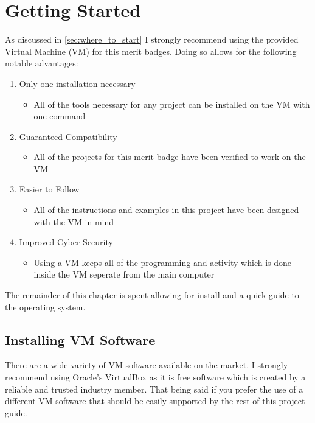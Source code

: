 \graphicspath{ {images/VM_Install} {images/Ubuntu_Intro} }

\chapter{Getting Started}
\label{chap:getting_started}

  As discussed in \autoref{sec:where_to_start} I strongly recommend using the provided
    Virtual Machine (VM) for this merit badges.
  Doing so allows for the following notable advantages:

  \begin{enumerate}
    \item Only one installation necessary
    \begin{itemize}
      \item All of the tools necessary for any project can be installed on the VM with one command
    \end{itemize}
    \item Guaranteed Compatibility
    \begin{itemize}
      \item All of the projects for this merit badge have been verified to work on the VM
    \end{itemize}
    \item Easier to Follow
    \begin{itemize}
      \item All of the instructions and examples in this project have been designed with the VM in mind
    \end{itemize}
    \item Improved Cyber Security
    \begin{itemize}
      \item Using a VM keeps all of the programming and activity which is done inside the VM seperate from the main computer
    \end{itemize}
  \end{enumerate}

  The remainder of this chapter is spent allowing for install and a quick guide to the operating system.

  \section{Installing VM Software}
  \label{sec:installing_vm_software}

    There are a wide variety of VM software available on the market.
    I strongly recommend using Oracle's VirtualBox as it is free software which is created by a 
      reliable and trusted industry member.
    That being said if you prefer the use of a different VM software that should be easily supported
      by the rest of this project guide.

